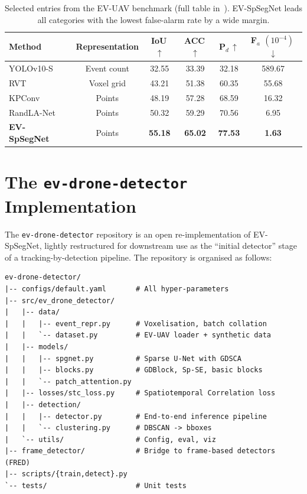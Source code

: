 \documentclass[11pt,a4paper]{article}
\begin{document}
\begin{table}[t]
  \centering
  \small
  \begin{tabular}{lccccc}
    \toprule
    Method & Representation & IoU\,$\uparrow$ & ACC\,$\uparrow$ &
    P$_d$\,$\uparrow$ & F$_a$ $(10^{-4})$\,$\downarrow$ \\
    \midrule
    YOLOv10-S~\cite{chen2025evspsegnet}        & Event count & 32.55 & 33.39 & 32.18 & 589.67 \\
    RVT~\cite{gehrig2023rvt}                    & Voxel grid  & 43.21 & 51.38 & 60.35 &  55.68 \\
    KPConv~\cite{thomas2019kpconv}              & Points      & 48.19 & 57.28 & 68.59 &  16.32 \\
    RandLA-Net~\cite{hu2020randla}              & Points      & 50.32 & 59.29 & 70.56 &   6.95 \\
    \textbf{EV-SpSegNet}~\cite{chen2025evspsegnet}
                                               & Points      & \textbf{55.18} & \textbf{65.02} & \textbf{77.53} & \textbf{1.63} \\
    \bottomrule
  \end{tabular}
  \caption{Selected entries from the EV-UAV benchmark
           (full table in~\cite[Tab.~2]{chen2025evspsegnet}).
           EV-SpSegNet leads all categories with the lowest false-alarm
           rate by a wide margin.}
  \label{tab:bench}
\end{table}

\section{The \texttt{ev-drone-detector} Implementation}
The \texttt{ev-drone-detector} repository is an open re-implementation
of EV-SpSegNet, lightly restructured for downstream use as the
``initial detector'' stage of a tracking-by-detection pipeline. The
repository is organised as follows:

\begin{lstlisting}[basicstyle=\ttfamily\footnotesize]
ev-drone-detector/
|-- configs/default.yaml       # All hyper-parameters
|-- src/ev_drone_detector/
|   |-- data/
|   |   |-- event_repr.py      # Voxelisation, batch collation
|   |   `-- dataset.py         # EV-UAV loader + synthetic data
|   |-- models/
|   |   |-- spgnet.py          # Sparse U-Net with GDSCA
|   |   |-- blocks.py          # GDBlock, Sp-SE, basic blocks
|   |   `-- patch_attention.py
|   |-- losses/stc_loss.py     # Spatiotemporal Correlation loss
|   |-- detection/
|   |   |-- detector.py        # End-to-end inference pipeline
|   |   `-- clustering.py      # DBSCAN -> bboxes
|   `-- utils/                 # Config, eval, viz
|-- frame_detector/            # Bridge to frame-based detectors (FRED)
|-- scripts/{train,detect}.py
`-- tests/                     # Unit tests
\end{lstlisting}
\end{document}
